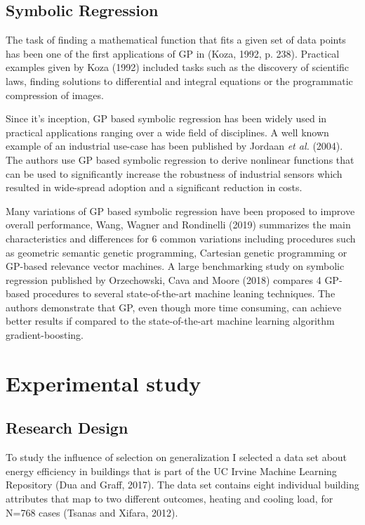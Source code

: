 \documentclass[
  12pt,
]{article}
\begin{document}
\hypertarget{symbolic-regression}{%
\subsection{Symbolic Regression}\label{symbolic-regression}}

The task of finding a mathematical function that fits a given set of
data points has been one of the first applications of GP in (Koza, 1992,
p. 238). Practical examples given by Koza (1992) included tasks such as
the discovery of scientific laws, finding solutions to differential and
integral equations or the programmatic compression of images.

Since it's inception, GP based symbolic regression has been widely used
in practical applications ranging over a wide field of disciplines. A
well known example of an industrial use-case has been published by
Jordaan \emph{et al.} (2004). The authors use GP based symbolic
regression to derive nonlinear functions that can be used to
significantly increase the robustness of industrial sensors which
resulted in wide-spread adoption and a significant reduction in costs.

Many variations of GP based symbolic regression have been proposed to
improve overall performance, Wang, Wagner and Rondinelli (2019)
summarizes the main characteristics and differences for 6 common
variations including procedures such as geometric semantic genetic
programming, Cartesian genetic programming or GP-based relevance vector
machines. A large benchmarking study on symbolic regression published by
Orzechowski, Cava and Moore (2018) compares 4 GP-based procedures to
several state-of-the-art machine leaning techniques. The authors
demonstrate that GP, even though more time consuming, can achieve better
results if compared to the state-of-the-art machine learning algorithm
gradient-boosting.

\hypertarget{experimental-study}{%
\section{Experimental study}\label{experimental-study}}

\hypertarget{research-design}{%
\subsection{Research Design}\label{research-design}}

To study the influence of selection on generalization I selected a data
set about energy efficiency in buildings that is part of the UC Irvine
Machine Learning Repository (Dua and Graff, 2017). The data set contains
eight individual building attributes that map to two different outcomes,
heating and cooling load, for N=768 cases (Tsanas and Xifara, 2012).
\end{document}
